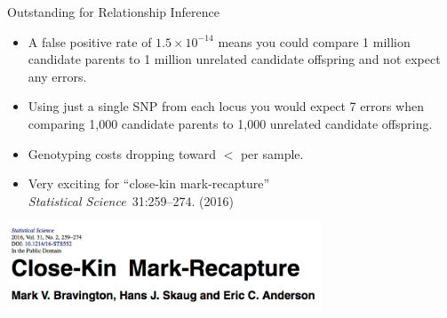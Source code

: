 \documentclass[letter,graphicx]{beamer}
\begin{document}
\begin{frame}{Outstanding for Relationship Inference}
\begin{itemize}
\item A false positive rate of $1.5 \times 10^{-14}$ means you could compare 1 million candidate parents to 1 million unrelated candidate offspring and not expect any errors.
\item Using just a single SNP from each locus you would expect 7 errors when comparing 1,000 candidate parents to 1,000 unrelated candidate offspring.
\item Genotyping costs dropping toward $<$ per sample.
\item Very exciting for ``close-kin mark-recapture''\\
{\em Statistical Science}~31:259--274. (2016)
\end{itemize}
\begin{center}
\includegraphics[width = 0.7\textwidth]{mhap_figs/ckmr-header.png}
\end{center}
\end{frame}
\end{document}
